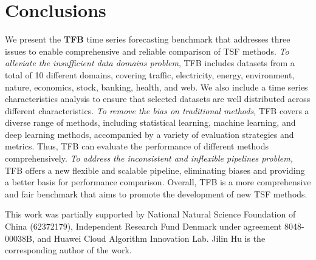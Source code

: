 \documentclass[sigconf, nonacm, pdfa]{acmart}
\begin{document}
\section{Conclusions}
\label{Conclusions}
We present the \textbf{TFB} time series forecasting benchmark that addresses three issues to enable comprehensive and reliable comparison of TSF methods. \textit{To alleviate the insufficient data domains problem}, TFB includes datasets from a total of 10 different domains, covering traffic, electricity, energy, environment, nature, economics, stock, banking, health, and web. We also include a time series characteristics analysis to ensure that selected datasets are well distributed across different characteristics. \textit{To remove the bias on traditional methods,} TFB covers a diverse range of methods, including statistical learning, machine learning, and deep learning methods, accompanied by a variety of evaluation strategies and metrics. Thus, TFB can evaluate the performance of different methods comprehensively. \textit{To address the inconsistent and inflexible pipelines problem,} TFB offers a new flexible and scalable pipeline, eliminating biases and providing a better basis for performance comparison. Overall, TFB is a more comprehensive and fair benchmark that aims to promote the development of new TSF methods. 




\begin{acks}
This work was partially supported by National Natural Science Foundation of China (62372179), Independent Research Fund Denmark under agreement 8048-00038B, and Huawei Cloud Algorithm Innovation Lab. Jilin Hu is the corresponding author of the work.
\end{acks}




\end{document}
